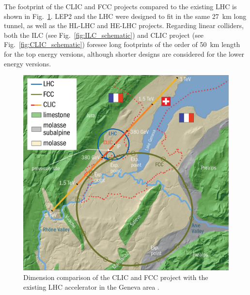 The footprint of the CLIC and FCC projects compared to the existing LHC is shown in Fig.~\ref{fig:FCC_vs_LHC}. LEP2 and the LHC were designed to fit in the same 27~km long tunnel, as well as the HL-LHC and HE-LHC projects. Regarding linear colliders, both the ILC (see Fig.~\ref{fig:ILC_schematic}) and CLIC project (see Fig.~\ref{fig:CLIC_schematic}) foresee long footprints of the order of  50~km length for the top energy versions, although shorter designs are considered for the lower energy versions.

















\begin{figure}[!h]
\centering
\vspace{10mm}
\includegraphics[width=120mm, keepaspectratio]{pictures/FCC_vs_CLIC_vs_LHC}
\caption{Dimension comparison of the CLIC and FCC project with the existing LHC accelerator in the Geneva area \cite{CERN-COURIER-59-5}.}
\label{fig:FCC_vs_LHC}
\end{figure}

